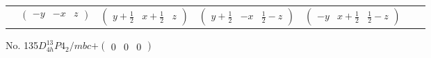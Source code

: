 \documentclass[fleqn,9pt,landscape]{jsarticle}
\begin{document}
\begin{center}
\begin{longtable}{ccccccc}
& $ \begin{pmatrix} - y & - x & z \end{pmatrix} $ & $ \begin{pmatrix} y + \frac{1}{2} & x + \frac{1}{2} & z \end{pmatrix} $ & $ \begin{pmatrix} y + \frac{1}{2} & - x & \frac{1}{2} - z \end{pmatrix} $ & $ \begin{pmatrix} - y & x + \frac{1}{2} & \frac{1}{2} - z \end{pmatrix} $ & $  $ & $  $ \\
\end{longtable}
\end{center}
\newpage
No. 135\quad$D_{4h}^{13}$\quad$P4_2/mbc$\quad[ tetragonal ]\quad$+\begin{pmatrix} 0 & 0 & 0 \end{pmatrix}$
\end{document}
